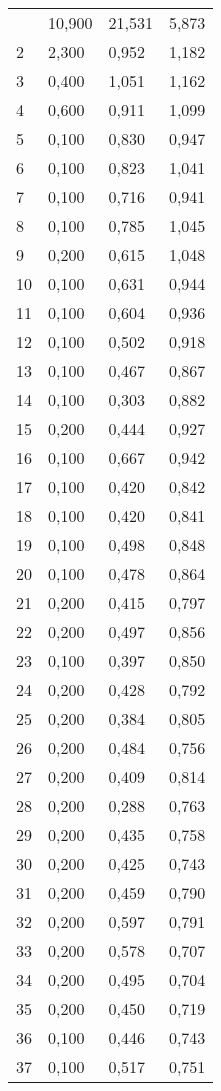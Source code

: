 \begin{longtable}{|l|l|l|l|}
        \hline \hline
        \endlastfoot
        1&10,900&21,531&5,873\\
        2&2,300&0,952&1,182\\
        3&0,400&1,051&1,162\\
        4&0,600&0,911&1,099\\
        5&0,100&0,830&0,947\\
        6&0,100&0,823&1,041\\
        7&0,100&0,716&0,941\\
        8&0,100&0,785&1,045\\
        9&0,200&0,615&1,048\\
        10&0,100&0,631&0,944\\
        11&0,100&0,604&0,936\\
        12&0,100&0,502&0,918\\
        13&0,100&0,467&0,867\\
        14&0,100&0,303&0,882\\
        15&0,200&0,444&0,927\\
        16&0,100&0,667&0,942\\
        17&0,100&0,420&0,842\\
        18&0,100&0,420&0,841\\
        19&0,100&0,498&0,848\\
        20&0,100&0,478&0,864\\
        21&0,200&0,415&0,797\\
        22&0,200&0,497&0,856\\
        23&0,100&0,397&0,850\\
        24&0,200&0,428&0,792\\
        25&0,200&0,384&0,805\\
        26&0,200&0,484&0,756\\
        27&0,200&0,409&0,814\\
        28&0,200&0,288&0,763\\
        29&0,200&0,435&0,758\\
        30&0,200&0,425&0,743\\
        31&0,200&0,459&0,790\\
        32&0,200&0,597&0,791\\
        33&0,200&0,578&0,707\\
        34&0,200&0,495&0,704\\
        35&0,200&0,450&0,719\\
        36&0,100&0,446&0,743\\
        37&0,100&0,517&0,751\\

\end{longtable}
